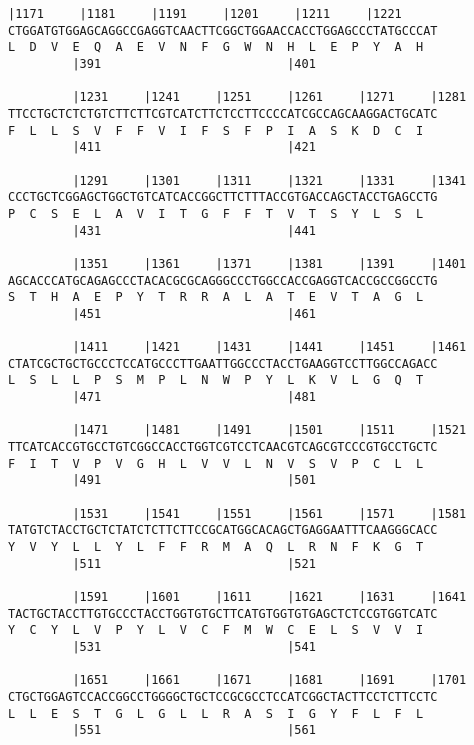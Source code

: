 \documentclass{article}
\begin{document}
\begin{Verbatim}[fontfamily=courier]
         |1171     |1181     |1191     |1201     |1211     |1221
CTGGATGTGGAGCAGGCCGAGGTCAACTTCGGCTGGAACCACCTGGAGCCCTATGCCCAT
L  D  V  E  Q  A  E  V  N  F  G  W  N  H  L  E  P  Y  A  H  
         |391                          |401                 

         |1231     |1241     |1251     |1261     |1271     |1281
TTCCTGCTCTCTGTCTTCTTCGTCATCTTCTCCTTCCCCATCGCCAGCAAGGACTGCATC
F  L  L  S  V  F  F  V  I  F  S  F  P  I  A  S  K  D  C  I  
         |411                          |421                 

         |1291     |1301     |1311     |1321     |1331     |1341
CCCTGCTCGGAGCTGGCTGTCATCACCGGCTTCTTTACCGTGACCAGCTACCTGAGCCTG
P  C  S  E  L  A  V  I  T  G  F  F  T  V  T  S  Y  L  S  L  
         |431                          |441                 

         |1351     |1361     |1371     |1381     |1391     |1401
AGCACCCATGCAGAGCCCTACACGCGCAGGGCCCTGGCCACCGAGGTCACCGCCGGCCTG
S  T  H  A  E  P  Y  T  R  R  A  L  A  T  E  V  T  A  G  L  
         |451                          |461                 

         |1411     |1421     |1431     |1441     |1451     |1461
CTATCGCTGCTGCCCTCCATGCCCTTGAATTGGCCCTACCTGAAGGTCCTTGGCCAGACC
L  S  L  L  P  S  M  P  L  N  W  P  Y  L  K  V  L  G  Q  T  
         |471                          |481                 

         |1471     |1481     |1491     |1501     |1511     |1521
TTCATCACCGTGCCTGTCGGCCACCTGGTCGTCCTCAACGTCAGCGTCCCGTGCCTGCTC
F  I  T  V  P  V  G  H  L  V  V  L  N  V  S  V  P  C  L  L  
         |491                          |501                 

         |1531     |1541     |1551     |1561     |1571     |1581
TATGTCTACCTGCTCTATCTCTTCTTCCGCATGGCACAGCTGAGGAATTTCAAGGGCACC
Y  V  Y  L  L  Y  L  F  F  R  M  A  Q  L  R  N  F  K  G  T  
         |511                          |521                 

         |1591     |1601     |1611     |1621     |1631     |1641
TACTGCTACCTTGTGCCCTACCTGGTGTGCTTCATGTGGTGTGAGCTCTCCGTGGTCATC
Y  C  Y  L  V  P  Y  L  V  C  F  M  W  C  E  L  S  V  V  I  
         |531                          |541                 

         |1651     |1661     |1671     |1681     |1691     |1701
CTGCTGGAGTCCACCGGCCTGGGGCTGCTCCGCGCCTCCATCGGCTACTTCCTCTTCCTC
L  L  E  S  T  G  L  G  L  L  R  A  S  I  G  Y  F  L  F  L  
         |551                          |561                 

\end{Verbatim}
\end{document}
